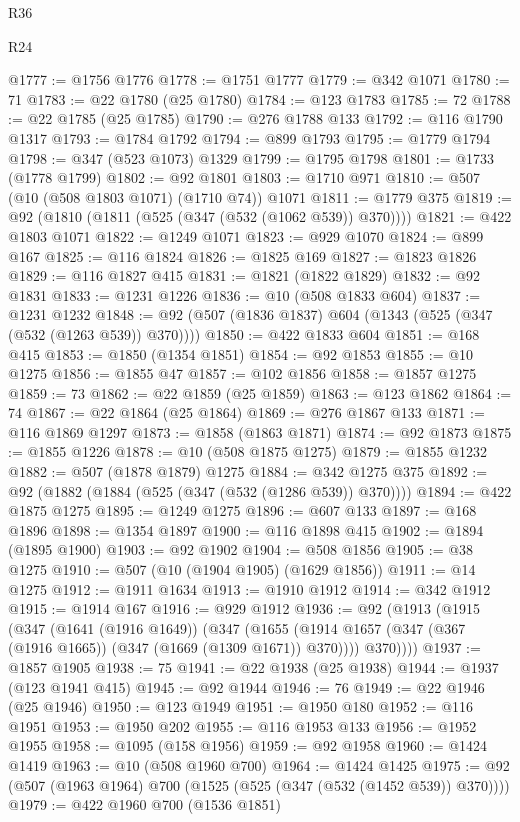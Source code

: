 \begin{lexlean}{R36}
\begin{lexlean}{R24}
\begin{coremodule}
{{{{{{{{{{{{{{{{{{{{{{{{{{{{{{{{{{{{{{{{{{{{{{{{{{{{{{{{{{{{{{{{{{{{{{{{{{{{{{{{{{{{{{{{{{{{{{{{{{{{{{{{{{{{{{{{{{{{{{{{{{{{{{{{{{{{{{{{{{{{{{{{{{{{{{{{{{{{{{{{{{{{{{{{{{{{{{{{{{{{{{{{{{{{{{{{{{{@1777 := @1756 @1776
@1778 := @1751 @1777
@1779 := @342 @1071
@1780 := 71
@1783 := @22 @1780 (@25 @1780)
@1784 := @123 @1783
@1785 := 72
@1788 := @22 @1785 (@25 @1785)
@1790 := @276 @1788 @133
@1792 := @116 @1790 @1317
@1793 := @1784 @1792
@1794 := @899 @1793
@1795 := @1779 @1794
@1798 := @347 (@523 @1073) @1329
@1799 := @1795 @1798
@1801 := @1733 (@1778 @1799)
@1802 := @92 @1801
@1803 := @1710 @971
@1810 := @507 (@10 (@508 @1803 @1071) (@1710 @74)) @1071
@1811 := @1779 @375
@1819 := @92 (@1810 (@1811 (@525 (@347 (@532 (@1062 @539)) @370))))
@1821 := @422 @1803 @1071
@1822 := @1249 @1071
@1823 := @929 @1070
@1824 := @899 @167
@1825 := @116 @1824
@1826 := @1825 @169
@1827 := @1823 @1826
@1829 := @116 @1827 @415
@1831 := @1821 (@1822 @1829)
@1832 := @92 @1831
@1833 := @1231 @1226
@1836 := @10 (@508 @1833 @604)
@1837 := @1231 @1232
@1848 := @92 (@507 (@1836 @1837) @604 (@1343 (@525 (@347 (@532 (@1263 @539)) @370))))
@1850 := @422 @1833 @604
@1851 := @168 @415
@1853 := @1850 (@1354 @1851)
@1854 := @92 @1853
@1855 := @10 @1275
@1856 := @1855 @47
@1857 := @102 @1856
@1858 := @1857 @1275
@1859 := 73
@1862 := @22 @1859 (@25 @1859)
@1863 := @123 @1862
@1864 := 74
@1867 := @22 @1864 (@25 @1864)
@1869 := @276 @1867 @133
@1871 := @116 @1869 @1297
@1873 := @1858 (@1863 @1871)
@1874 := @92 @1873
@1875 := @1855 @1226
@1878 := @10 (@508 @1875 @1275)
@1879 := @1855 @1232
@1882 := @507 (@1878 @1879) @1275
@1884 := @342 @1275 @375
@1892 := @92 (@1882 (@1884 (@525 (@347 (@532 (@1286 @539)) @370))))
@1894 := @422 @1875 @1275
@1895 := @1249 @1275
@1896 := @607 @133
@1897 := @168 @1896
@1898 := @1354 @1897
@1900 := @116 @1898 @415
@1902 := @1894 (@1895 @1900)
@1903 := @92 @1902
@1904 := @508 @1856
@1905 := @38 @1275
@1910 := @507 (@10 (@1904 @1905) (@1629 @1856))
@1911 := @14 @1275
@1912 := @1911 @1634
@1913 := @1910 @1912
@1914 := @342 @1912
@1915 := @1914 @167
@1916 := @929 @1912
@1936 := @92
    (@1913
      (@1915
        (@347
          (@1641 (@1916 @1649))
          (@347
            (@1655 (@1914 @1657 (@347 (@367 (@1916 @1665)) (@347 (@1669 (@1309 @1671)) @370))))
            @370))))
@1937 := @1857 @1905
@1938 := 75
@1941 := @22 @1938 (@25 @1938)
@1944 := @1937 (@123 @1941 @415)
@1945 := @92 @1944
@1946 := 76
@1949 := @22 @1946 (@25 @1946)
@1950 := @123 @1949
@1951 := @1950 @180
@1952 := @116 @1951
@1953 := @1950 @202
@1955 := @116 @1953 @133
@1956 := @1952 @1955
@1958 := @1095 (@158 @1956)
@1959 := @92 @1958
@1960 := @1424 @1419
@1963 := @10 (@508 @1960 @700)
@1964 := @1424 @1425
@1975 := @92 (@507 (@1963 @1964) @700 (@1525 (@525 (@347 (@532 (@1452 @539)) @370))))
@1979 := @422 @1960 @700 (@1536 @1851)
}}}}}}}}}}}}}}}}}}}}}}}}}}}}}}}}}}}}}}}}}}}}}}}}}}}}}}}}}}}}}}}}}}}}}}}}}}}}}}}}}}}}}}}}}}}}}}}}}}}}}}}}}}}}}}}}}}}}}}}}}}}}}}}}}}}}}}}}}}}}}}}}}}}}}}}}}}}}}}}}}}}}}}}}}}}}}}}}}}}}}}}}}}}}}}}}}}}
\end{coremodule}
\end{lexlean}
\end{lexlean}
